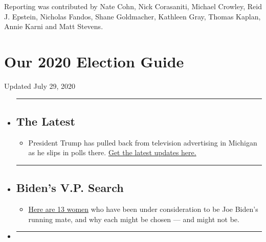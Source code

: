 Reporting was contributed by Nate Cohn, Nick Corasaniti, Michael
Crowley, Reid J. Epstein, Nicholas Fandos, Shane Goldmacher, Kathleen
Gray, Thomas Kaplan, Annie Karni and Matt Stevens.

\hypertarget{our-2020-election-guide}{%
\section{Our 2020 Election Guide}\label{our-2020-election-guide}}

Updated July 29, 2020

\begin{itemize}
\item
  \begin{center}\rule{0.5\linewidth}{\linethickness}\end{center}

  \hypertarget{the-latest}{%
  \subsection{The Latest}\label{the-latest}}

  \begin{itemize}
  \tightlist
  \item
    President Trump has pulled back from television advertising in
    Michigan as he slips in polls there.
    \href{https://www.nytimes.com/2020/07/29/us/elections/biden-vs-trump.html?action=click\&pgtype=Article\&state=default\&region=BELOW_MAIN_CONTENT\&context=storylines_guide}{Get
    the latest updates here.}
  \end{itemize}
\item
  \begin{center}\rule{0.5\linewidth}{\linethickness}\end{center}

  \hypertarget{bidens-vp-search}{%
  \subsection{Biden's V.P. Search}\label{bidens-vp-search}}

  \begin{itemize}
  \tightlist
  \item
    \href{https://www.nytimes.com/article/biden-vice-president-2020.html?action=click\&pgtype=Article\&state=default\&region=BELOW_MAIN_CONTENT\&context=storylines_guide}{Here
    are 13 women} who have been under consideration to be Joe Biden's
    running mate, and why each might be chosen --- and might not be.
  \end{itemize}
\item
  \begin{center}\rule{0.5\linewidth}{\linethickness}\end{center}


\end{itemize}
